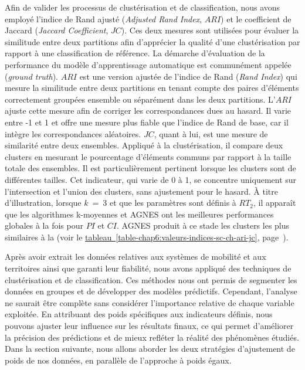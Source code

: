 \begin{refsegment}
Afin de valider les processus de clustérisation et de classification, nous avons employé l'indice de Rand ajusté (\textsl{Adjusted Rand Index}, \(ARI\)) et le coefficient de Jaccard (\textsl{Jaccard Coefficient}, \(JC\)). Ces deux mesures sont utilisées pour évaluer la similitude entre deux partitions afin d'apprécier la qualité d’une clustérisation par rapport à une classification de référence. La démarche d'évaluation de la performance du modèle d'apprentissage automatique est communément appelée  (\textsl{ground truth}). \(ARI\) est une version ajustée de l’indice de Rand (\textsl{Rand Index}) qui mesure la similitude entre deux partitions en tenant compte des paires d’éléments correctement groupées ensemble ou séparément dans les deux partitions. L’\(ARI\) ajuste cette mesure afin de corriger les correspondances dues au hasard. Il varie entre -1 et 1 et offre une mesure plus fiable que l’indice de Rand de base, car il intègre les correspondances aléatoires. \(JC\), quant à lui, est une mesure de similarité entre deux ensembles. Appliqué à la clustérisation, il compare deux clusters en mesurant le pourcentage d’éléments communs par rapport à la taille totale des ensembles. Il est particulièrement pertinent lorsque les clusters sont de différentes tailles. Cet indicateur, qui varie de 0 à 1, se concentre uniquement sur l’intersection et l’union des clusters, sans ajustement pour le hasard. À titre d’illustration, lorsque \(k~=~3\) et que les paramètres sont définis à \(RT_{2}\), il apparaît que les algorithmes k-moyennes et \acrshort{AGNES} ont les meilleures performances globales à la fois pour \(PI\) et \(CI\). \acrshort{AGNES} produit à ce stade les clusters les plus similaires à la  (voir le \hyperref[table-chap6:valeurs-indices-sc-ch-ari-jc]{tableau~\ref{table-chap6:valeurs-indices-sc-ch-ari-jc}}, page~\pageref{table-chap6:valeurs-indices-sc-ch-ari-jc}).%

Après avoir extrait les données relatives aux systèmes de mobilité et aux territoires ainsi que garanti leur fiabilité, nous avons appliqué des techniques de clustérisation et de classification. Ces méthodes nous ont permis de segmenter les données en groupes et de développer des modèles prédictifs. Cependant, l'analyse ne saurait être complète sans considérer l'importance relative de chaque variable exploitée. En attribuant des poids spécifiques aux indicateurs définis, nous pouvons ajuster leur influence sur les résultats finaux, ce qui permet d'améliorer la précision des prédictions et de mieux refléter la réalité des phénomènes étudiés. Dans la section suivante, nous allons aborder les deux stratégies d'ajustement de poids de nos données, en parallèle de l'approche à poids égaux.%


\end{refsegment}
